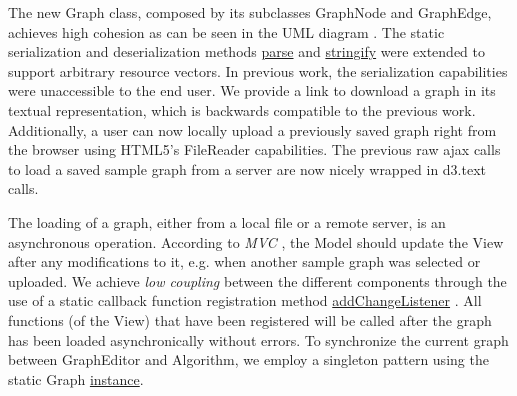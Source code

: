 The new Graph class, composed by its subclasses GraphNode and GraphEdge, achieves high cohesion as can be seen in the UML diagram . The static serialization and deserialization methods \underline{parse} and \underline{stringify} were extended to support arbitrary resource vectors. In previous work, the serialization capabilities were unaccessible to the end user. We provide a link to download a graph in its textual representation, which is backwards compatible to the previous work. Additionally, a user can now locally upload a previously saved graph right from the browser using HTML5's FileReader capabilities. The previous raw ajax calls to load a saved sample graph from a server are now nicely wrapped in d3.text calls.

The loading of a graph, either from a local file or a remote server, is an asynchronous operation. According to \textit{MVC} , the Model should update the View after any modifications to it, e.g. when another sample graph was selected or uploaded. We achieve \textit{low coupling}  between the different components through the use of a static callback function registration method \underline{addChangeListener} . All functions (of the View) that have been registered will be called after the graph has been loaded asynchronically without errors. To synchronize the current graph between GraphEditor and Algorithm, we employ a singleton pattern using the static Graph \underline{instance}.


\renewcommand{\umldrawcolor}{black}

\renewcommand{\umlfillcolor}{lightyellow}

